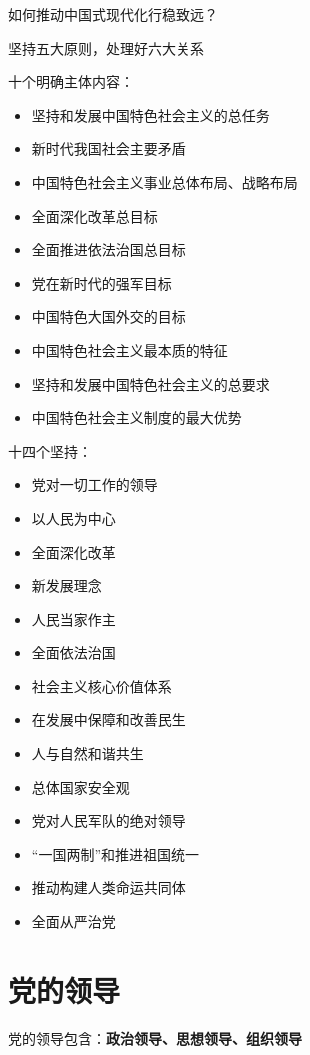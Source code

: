 \begin{question}
    如何推动中国式现代化行稳致远？
\end{question}
坚持五大原则，处理好六大关系
\begin{notation}
    十个明确主体内容：
    \begin{itemize}
        \item 坚持和发展中国特色社会主义的总任务
        \item 新时代我国社会主要矛盾
        \item 中国特色社会主义事业总体布局、战略布局
        \item 全面深化改革总目标
        \item 全面推进依法治国总目标
        \item 党在新时代的强军目标
        \item 中国特色大国外交的目标
        \item 中国特色社会主义最本质的特征
        \item 坚持和发展中国特色社会主义的总要求
        \item 中国特色社会主义制度的最大优势
    \end{itemize}
    十四个坚持：
    \begin{itemize}
        \item 党对一切工作的领导
        \item 以人民为中心
        \item 全面深化改革
        \item 新发展理念
        \item 人民当家作主
        \item 全面依法治国
        \item 社会主义核心价值体系
        \item 在发展中保障和改善民生
        \item 人与自然和谐共生
        \item 总体国家安全观
        \item 党对人民军队的绝对领导
        \item “一国两制”和推进祖国统一
        \item 推动构建人类命运共同体
        \item 全面从严治党
    \end{itemize}
\end{notation}
\section{党的领导}%
\label{sec:党的领导}
党的领导包含：\textbf{政治领导、思想领导、组织领导}
